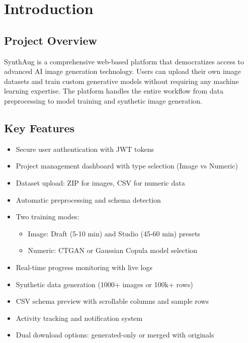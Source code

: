 \documentclass[11pt,a4paper]{article}
\begin{document}
\newpage

\tableofcontents
\newpage

\section{Introduction}

\subsection{Project Overview}
SynthAug is a comprehensive web-based platform that democratizes access to advanced AI image generation technology. Users can upload their own image datasets and train custom generative models without requiring any machine learning expertise. The platform handles the entire workflow from data preprocessing to model training and synthetic image generation.

\subsection{Key Features}
\begin{itemize}[noitemsep]
    \item Secure user authentication with JWT tokens
    \item Project management dashboard with type selection (Image vs Numeric)
    \item Dataset upload: ZIP for images, CSV for numeric data
    \item Automatic preprocessing and schema detection
    \item Two training modes:
    \begin{itemize}
        \item Image: Draft (5-10 min) and Studio (45-60 min) presets
        \item Numeric: CTGAN or Gaussian Copula model selection
    \end{itemize}
    \item Real-time progress monitoring with live logs
    \item Synthetic data generation (1000+ images or 100k+ rows)
    \item CSV schema preview with scrollable columns and sample rows
    \item Activity tracking and notification system
    \item Dual download options: generated-only or merged with originals
\end{itemize}
\end{document}
